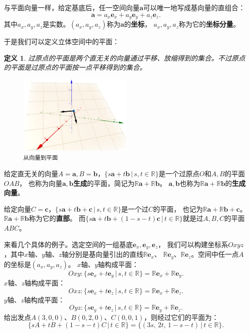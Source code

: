 \documentclass[12pt,UTF8]{ctexbook}
\newtheorem{df}{定义}[section]
\begin{document}
与平面向量一样，给定基底后，任一空间向量$\mathbf{a}$可以唯一地写成基向量的直组合：
$$ \mathbf{a} = a_x\mathbf{e}_x + a_y\mathbf{e}_y + a_z\mathbf{e}_z.$$
其中$a_x, a_y, a_z$是实数。$(a_x, a_y, a_z)$称为$\mathbf{a}$的\textbf{坐标}，
$a_x, a_y, a_z$称为它的\textbf{坐标分量}。

于是我们可以定义立体空间中的平面：
\begin{df}
    过原点的平面是两个直无关的向量通过平移、放缩得到的集合。不过原点的平面是过原点的平面按一点平移得到的集合。
\end{df}

\begin{figure}[h] 
    \centering
    \includegraphics[width=0.5\textwidth]{tu/空间基底1.png}
    \caption*{\texttt{从向量到平面}}
\end{figure}

给定直无关的向量$A = \mathbf{a}, B = \mathbf{b}$，$ \{s\mathbf{a} + t\mathbf{b} \, | \, s, t\in\mathbb{R}\}$是一个过原点$O$和$A, B$的平面$OAB$，
也称为向量$\mathbf{a},\mathbf{b}$\textbf{生成}的平面，简记为$\mathbb{R}\mathbf{a}+\mathbb{R}\mathbf{b}$。
$\mathbf{a},\mathbf{b}$也称为$\mathbb{R}\mathbf{a}+\mathbb{R}\mathbf{b}$的\textbf{生成向量}。

给定向量$C = \mathbf{c}$，$ \{s\mathbf{a}+t\mathbf{b}+\mathbf{c}\, | \, s,t\in\mathbb{R}\}$是一个过$C$的平面，
也记为$\mathbb{R}\mathbf{a}+\mathbb{R}\mathbf{b}+\mathbf{c}$。$\mathbb{R}\mathbf{a}+\mathbb{R}\mathbf{b}$称为它的\textbf{直部}。
而$ \{s\mathbf{a}+t\mathbf{b}+(1 - s - t)\mathbf{c} \, | \, t\in\mathbb{R}\}$就是过$A,B,C$的平面$ABC$。

来看几个具体的例子。选定空间的一组基底$\mathbf{e}_x,\mathbf{e}_y,\mathbf{e}_z$，
我们可以构建坐标系$Oxyz$，其中$x$轴、$y$轴、$z$轴分别是基向量引出的直线$\mathbb{R}\mathbf{e}_x$、
$\mathbb{R}\mathbf{e}_y$、$\mathbb{R}\mathbf{e}_z$。空间中任一点$A$的坐标是$(a_x,a_y,a_z)$。
$x$轴、$y$轴构成平面：
$$ Oxy : \{s\mathbf{e}_x+t\mathbf{e}_y\,|\,s,t\in\mathbb{R}\} = \mathbb{R}\mathbf{e}_x + \mathbb{R}\mathbf{e}_y. $$
$x$轴、$z$轴构成平面：
$$ Oxz : \{s\mathbf{e}_x+t\mathbf{e}_z\,|\,s,t\in\mathbb{R}\} = \mathbb{R}\mathbf{e}_x + \mathbb{R}\mathbf{e}_z. $$
$y$轴、$z$轴构成平面：
$$ Oyz : \{s\mathbf{e}_y+t\mathbf{e}_z\,|\,s,t\in\mathbb{R}\} = \mathbb{R}\mathbf{e}_y + \mathbb{R}\mathbf{e}_z. $$
给出发点$A(3,0,0)$、$B(0,2,0)$、$C(0,0,1)$，则经过它们的平面为：
$$ \{sA+tB+(1 - s - t)C \, | \, t\in\mathbb{R}\} = \{(3s,\,2t,\,1-s-t) \, | \, t\in\mathbb{R}\}. $$
\end{document}
